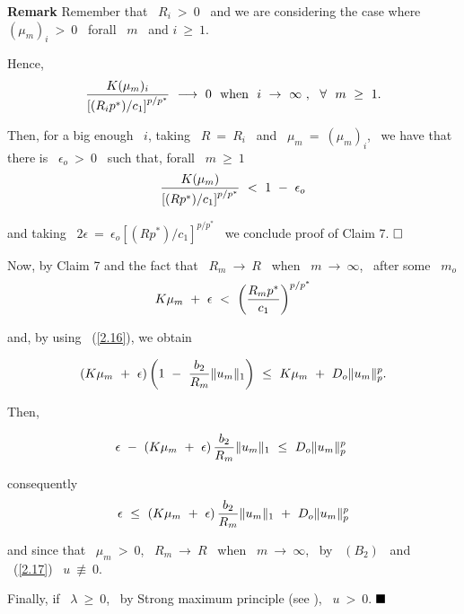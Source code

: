 \documentclass[12pt]{article}
\begin{document}
{\bf Remark}
Remember that \ $R_i \ > \ 0$ \ and we are considering the case where \ $(\mu_m)_i \ > \ 0$ \ forall \ $m$ \ and  $i \ \geq \ 1$.

Hence, 
$${\displaystyle}\frac{K(\mu_m)_i}{\left[(R_ip^{\ast})/c_1\right]^{p/p^{\ast}}} \ \longrightarrow \ 0 \ \ \mbox{when} \ \ i 
\ \rightarrow \ \infty \ , \  \ \forall \ \ m \ \geq \ 1.$$

Then, for a big enough \ $i$, taking \ $R \ = \ R_i$ \ and
 \ $\mu_m \ = \ (\mu_m)_i$, \ we have that there is \ $\epsilon_o \ > \ 0$ \ such that, forall \ $m \ \geq \ 1$
\vspace{-0.3cm}
$${\displaystyle}\frac{K(\mu_m)}{\left[(Rp^{\ast})/c_1\right]^{p/p^{\ast}}} \ < \ 1 \ - \ \epsilon_o$$

\noindent  and taking \ $2\epsilon \ = \ \epsilon_o\left[(Rp^{\ast})/c_1\right]^{p/p^{\ast}}$ \ 
we conclude proof of Claim 7. {$\hfill{\Box}$}
{\vspace{0.2cm}}

Now, by Claim 7 and the fact that \ $R_m \ \rightarrow \ R$ \ when \ $m \ \rightarrow \ \infty$, 
\ after some \ $m_o$
\vspace{-0.3cm}
$$K\mu_m \ + \ \epsilon \ < \ \left({\displaystyle}\frac{R_mp^{\ast}}{c_1}\right)^{p/p^{\ast}}$$

\noindent  and, by using \ (\ref{2.16}), we obtain 
\vspace{-0.3cm}

$$\left(K\mu_m \ + \ \epsilon \right)\left(1 \ - \ {\displaystyle}\frac{b_2}{R_m}\|u_m\|_1\right) \ \leq \ K\mu_m \ + \ D_o\|u_m\|^p_p.$$

Then, 
\vspace{-0.3cm}

$$\epsilon \ - \ \left(K\mu_m \ + \ \epsilon \right){\displaystyle}\frac{b_2}{R_m}\|u_m\|_1 \ \leq \ D_o\|u_m\|^p_p \ $$

\noindent  consequently
\vspace{-0.5mm}
\begin{eqnarray}
\label{2.17}
\epsilon \  \leq \ \left(K\mu_m \ + \ \epsilon \right){\displaystyle}\frac{b_2}{R_m}\|u_m\|_1 \ + \  D_o\|u_m\|^p_p 
\end{eqnarray}

\noindent  and since that \ $\mu_m \ > \ 0$, \ $R_m \ \rightarrow \ R$ \ when \ $m \ \rightarrow \ \infty$, 
\ by \ $(B_2)$ \ and \ (\ref{2.17}) \ $u \ \not\equiv \ 0$.
{\vspace{0.2cm}}

Finally, if \ $\lambda \ \geq \ 0$, \ by Strong  maximum principle (see \cite{druet4}), \ $u \ > \ 0$. {$\hfill{\rule{2.5mm}{2.5mm}}$} 
\end{document}
